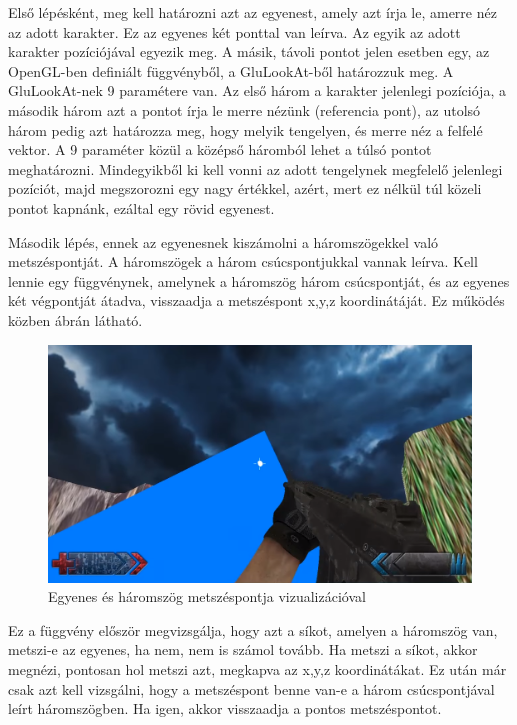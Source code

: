 Első lépésként, meg kell határozni azt az egyenest, amely azt írja le, amerre néz az adott karakter. Ez az egyenes két ponttal van leírva. Az egyik az adott karakter pozíciójával egyezik meg. A másik, távoli pontot jelen esetben egy, az OpenGL-ben definiált függvényből, a GluLookAt-ből határozzuk meg. A GluLookAt-nek 9 paramétere van. Az első három a karakter jelenlegi pozíciója, a második három azt a pontot írja le merre nézünk (referencia pont), az utolsó három pedig azt határozza meg, hogy melyik tengelyen, és merre néz a felfelé vektor. A 9 paraméter közül a középső háromból lehet a túlsó pontot  meghatározni. Mindegyikből ki kell vonni az adott tengelynek megfelelő jelenlegi pozíciót, majd megszorozni egy nagy értékkel, azért, mert ez nélkül túl közeli pontot kapnánk, ezáltal egy rövid egyenest.

Második lépés, ennek az egyenesnek kiszámolni a háromszögekkel való metszéspontját. A háromszögek a három csúcspontjukkal vannak leírva. Kell lennie egy függvénynek, amelynek a háromszög három csúcspontját, és az egyenes két végpontját átadva, visszaadja a metszéspont x,y,z koordinátáját. Ez működés közben  ábrán látható.

\begin{figure}[h]
\centering
\includegraphics[scale=0.48]{kepek/one_triangle.png}
\caption{Egyenes és háromszög metszéspontja vizualizációval}
\label{fig:triangle}
\end{figure}

Ez a függvény először megvizsgálja, hogy azt a síkot, amelyen a háromszög van, metszi-e az egyenes, ha nem, nem is számol tovább. Ha metszi a síkot, akkor megnézi, pontosan hol metszi azt, megkapva az x,y,z koordinátákat. Ez után már csak azt kell vizsgálni, hogy a metszéspont benne van-e a három csúcspontjával leírt háromszögben. Ha igen, akkor visszaadja a pontos metszéspontot.

